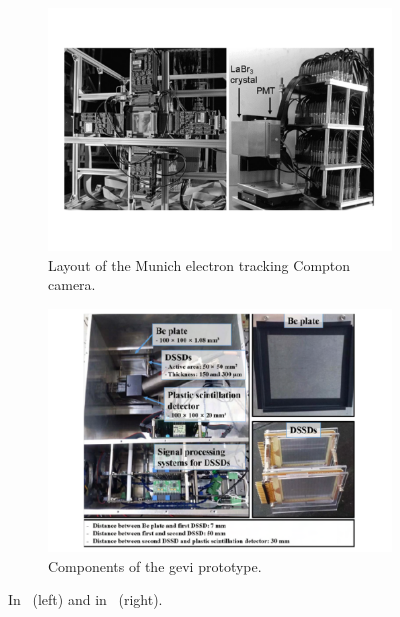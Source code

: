 \begin{figure}
\centering
\begin{subfigure}[t]{.49\textwidth}
\hspace{-0.7cm}\includegraphics[width=1.2\linewidth]{03_GraphicFiles/chapter2_GammaCameras/CC_Munich.pdf}
\caption{Layout of the Munich electron tracking Compton camera.}
\label{chap2::fig::CC_Munich}
\end{subfigure}
\begin{subfigure}[t]{.49\textwidth}
\hspace{-0.7cm}\includegraphics[width=1.2\linewidth]{03_GraphicFiles/chapter2_GammaCameras/CC_GEVI.pdf}
\caption{Components of the \gls{gevi} prototype.}
\label{chap2::fig::CC_GEVI}
\end{subfigure}
\caption{In~\cite{Thirolf2016} (left) and in~\cite{Lee2017} (right).}
\label{chap2::fig::CC_scintiSemicon}
\end{figure}

